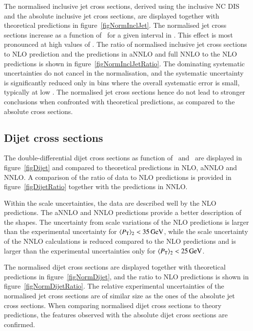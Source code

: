 \documentclass[12pt]{article}
\begin{document}
The normalised inclusive jet cross sections, derived using the inclusive NC DIS and the 
absolute inclusive jet cross sections, are displayed together with theoretical predictions
in figure~\ref{figNormInclJet}.
The normalised jet cross sections increase as a function of \Qsq\ for a given interval in \ptjet.
This effect is most pronounced at high values of \ptjet.
The ratio of normalised inclusive jet cross sections to NLO prediction and the predictions in aNNLO and full NNLO to the NLO predictions is shown in figure~\ref{figNormInclJetRatio}.
The dominating systematic uncertainties do not cancel in the normalisation, and the systematic uncertainty is significantly reduced only in bins where the overall systematic error is small, typically at low \ptjet.
The normalised jet cross sections hence do not lead to stronger conclusions
when confronted with theoretical predictions, as compared to the absolute cross sections.



\subsection{Dijet cross sections}
\label{sec:2jets}
The double-differential dijet cross sections as function of \meanptdi\ and \Qsq\ 
are displayed in figure~\ref{figDijet} and compared to theoretical
predictions in NLO, aNNLO and NNLO. 
A comparison of the ratio of data to NLO predictions is provided in figure~\ref{figDijetRatio}
together with the predictions in NNLO.

Within the scale uncertainties, the data are described well by the NLO predictions.
The aNNLO and NNLO predictions provide a better description of the shapes.
The uncertainty from scale variations of the NLO predictions is larger than 
the experimental uncertainty for  $\meanptdi<35\,\GeV$,
while the scale uncertainty of the NNLO calculations is reduced compared to the 
NLO predictions and is larger than the experimental uncertainties only for $\meanptdi<25\,\GeV$.


The normalised dijet cross sections are displayed together with theoretical predictions
in figure~\ref{figNormDijet}, and the ratio to NLO predictions is shown in figure~\ref{figNormDijetRatio}.
The relative experimental uncertainties of the normalised jet cross sections are of similar size
as the ones of the absolute jet cross sections.
When comparing normalised dijet cross sections to theory predictions, the features 
observed with the absolute dijet cross sections are confirmed. 
\end{document}
